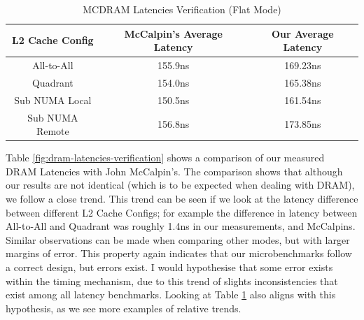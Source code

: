 \documentclass[bsc,frontabs,twoside,singlespacing,parskip,deptreport]{infthesis}     %
\begin{document}
\begin{table}[!h]
\begin{center}
\caption{MCDRAM Latencies Verification (Flat Mode)}
\label{fig:mcdram-latencies-verification}
\begin{tabular}{ |c|c|c| } 
    \hline
    L2 Cache Config  & McCalpin's Average Latency & Our Average Latency \\
    \hline
    All-to-All      & 155.9ns  & 169.23ns \\
    Quadrant        & 154.0ns  & 165.38ns \\
    Sub NUMA Local  & 150.5ns  & 161.54ns \\
    Sub NUMA Remote & 156.8ns  & 173.85ns \\
    \hline
\end{tabular}
\end{center}
\end{table}

Table \ref{fig:dram-latencies-verification} shows a comparison of our measured DRAM Latencies with John McCalpin's. The comparison shows that although our results are not identical (which is to be expected when dealing with DRAM), we follow a close trend. This trend can be seen if we look at the latency difference between different L2 Cache Configs; for example the difference in latency between All-to-All and Quadrant was roughly 1.4ns in our measurements, and McCalpins. Similar observations can be made when comparing other modes, but with larger margins of error. This property again indicates that our microbenchmarks follow a correct design, but errors exist. I would hypothesise that some error exists within the timing mechanism, due to this trend of slights inconsistencies that exist among all latency benchmarks. Looking at Table \ref{fig:mcdram-latencies-verification} also aligns with this hypothesis, as we see more examples of relative trends.
\end{document}
